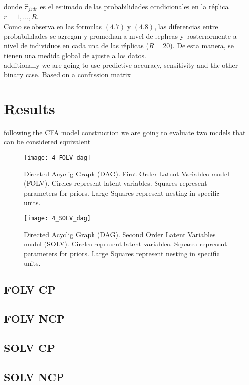 \noindent donde $\hat{\pi}_{jkdr}$ es el estimado de las probabilidades condicionales en la réplica $r = 1, \dots, R$.\\

\noindent Como se observa en las formulas $(4.7)$ y $(4.8)$, las diferencias entre probabilidades se agregan y promedian a nivel de replicas y posteriormente a nivel de individuos en cada una de las réplicas ($R=20$). De esta manera, se tienen una medida global de ajuste a los datos. \\


additionally we are going to use predictive accuracy, sensitivity and the other
binary case. Based on a confussion matrix 



\section{Results}

following the CFA model construction we are going to evaluate two models that can be considered equivalent 
%
\begin{figure}[h]
	\centering
	\texttt{[image: 4\_FOLV\_dag]}
	\caption[Directed Acyclig Graph (DAG). First Order Latent Variables model (FOLV).]%
	{Directed Acyclig Graph (DAG). First Order Latent Variables model (FOLV). Circles represent latent variables. Squares represent parameters for priors. Large Squares represent nesting in specific units.}
	\label{fig:FOLV_model}
\end{figure}
%
\begin{figure}[h]
	\centering
	\texttt{[image: 4\_SOLV\_dag]}
	\caption[Directed Acyclic Graph (DAG). Second Order Latent Variables model (SOLV).]%
	{Directed Acyclig Graph (DAG). Second Order Latent Variables model (SOLV). Circles represent latent variables. Squares represent parameters for priors. Large Squares represent nesting in specific units.}
	\label{fig:SOLV_model}
\end{figure}

\subsection{FOLV CP}

\subsection{FOLV NCP}

\subsection{SOLV CP}

\subsection{SOLV NCP}

